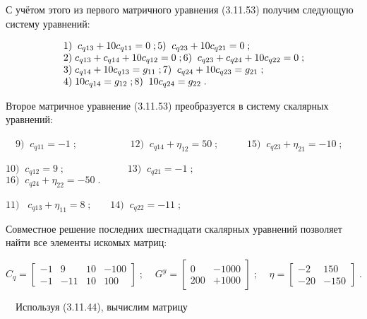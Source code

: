 \documentclass[a4paper]{article}
\begin{document}
{\begin{russian}\sffamily
С учётом этого из первого матричного уравнения (3.11.53) получим следующую систему уравнений:
\end{russian}}

\begin{equation*}
\begin{matrix}\;1)\;\;c_{q13}+10c_{q11}=0\;;5)\;\;c_{q23}+10c_{q21}=0\;;\hfill\null
\\\;2)\;c_{q13}+c_{q14}+10c_{q12}=0\;;6)\;\;c_{q23}+c_{q24}+10c_{q22}=0\;;\hfill\null
\\\;3)\;c_{q14}+10c_{q13}=g_{11}\;;7)\;\;c_{q24}+10c_{q23}=g_{21}\;;\hfill\null
\\\;4)\;10c_{q14}=g_{12}\;;8)\;\;10c_{q24}=g_{22}\;.\hfill\null \end{matrix}\hfill 
\end{equation*}
{\begin{russian}\sffamily
Второе матричное уравнение (3.11.53) преобразуется в систему скалярных уравнений:
\end{russian}}

{\begin{russian}\sffamily
\ \  $9)\;\;c_{q11}=-1\;;$ \ \ \ \ \ \ \ \ \ \  $12)\;\;c_{q14}+η_{12}=50\;;$ \ \ \ \ \  $15)\;\;c_{q23}+η_{21}=-10\;;$
\end{russian}}

{\begin{russian}\sffamily
 $10)\;\;c_{q12}=9\;;$ \ \ \ \ \ \ \ \ \ \ \ \  $13)\;\;c_{q21}=-1\;;$ \ \ \ \ \ \ \ \ \ \ \ \ \ \ 
$16)\;\;c_{q24}+η_{22}=-50\;.$
\end{russian}}

{\begin{russian}\sffamily
 $11)\;\;\;c_{q13}+η_{11}=8\;;$ \ \ \  $14)\;\;c_{q22}=-11\;;$
\end{russian}}

{\begin{russian}\sffamily
Совместное решение последних шестнадцати скалярных уравнений позволяет найти все элементы искомых матриц:
\end{russian}}


\bigskip

\begin{equation*}
C_q=\left[\begin{matrix}-1&9&10&-100\\-1&-11&10&100\end{matrix}\right]\;;\;\;\;\;G^y=\left[\begin{matrix}0&-1000\\200&+1000\end{matrix}\right]\;;\;\;\;\;η=\left[\begin{matrix}-2&150\\-20&-150\end{matrix}\right]\;.
\end{equation*}
{\begin{russian}\sffamily
\ \ Используя (3.11.44), вычислим матрицу
\end{russian}}
\end{document}
